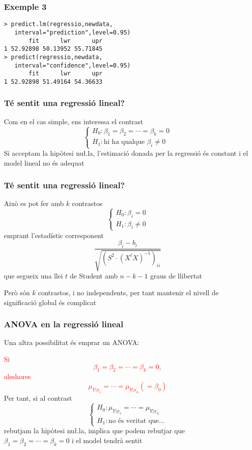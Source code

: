\documentclass[12pt,t]{beamer}
\newcommand{\red}[1]{\textcolor{red}{#1}}
\theoremstyle{plain}
\theoremstyle{definition}
\begin{document}
\begin{frame}[fragile]
\frametitle{Exemple 3}
\vspace*{-2ex}

\begin{verbatim}
> predict.lm(regressio,newdata,
   interval="prediction",level=0.95)
       fit      lwr      upr
1 52.92898 50.13952 55.71845
> predict(regressio,newdata,
   interval="confidence",level=0.95)
       fit      lwr      upr
1 52.92898 51.49164 54.36633
\end{verbatim}

\end{frame}

\begin{frame}
\frametitle{Té sentit una regressió lineal?}
Com en el cas simple, ens interessa el contrast
$$
\left\{\begin{array}{l} H_0: \beta_1=\beta_2=\cdots=\beta_k=0 \\
H_1: \mbox{hi ha qualque }\beta_i\not= 0 \end{array}
\right.
$$
Si acceptam la hipòtesi nu\l.la, l'estimació donada per la regressió és constant i el model lineal no és adequat

\end{frame}

\begin{frame}
\frametitle{Té sentit una regressió lineal?}

Això es pot fer amb $k$ contrastos
$$
\left\{\begin{array}{l} H_0: \beta_i=0 \\
H_1: \beta_i\neq 0 \end{array}
\right.
$$
emprant l'estadístic corresponent
$$
\frac{\beta_i-b_i}{\sqrt{(S^2\cdot (X^t X)^{-1})_{ii}}}
$$
que segueix una llei $t$ de Student amb $n-k-1$ graus de
llibertat\medskip

Però són $k$ contrastos, i no independents, per tant mantenir el nivell de significació global és complicat


\end{frame}




\begin{frame}
\frametitle{ANOVA en la  regressió lineal}

Una altra possibilitat és emprar un ANOVA:
\medskip

\red{Si $$\beta_1=\beta_2=\cdots=\beta_k=0,$$ aleshores $$\mu_{Y|\underline{x}_1}=\cdots=\mu_{Y|\underline{x}_n}(=\beta_0)$$}
Per tant, si al contrast
$$
\left\{\begin{array}{l}
H_0:\mu_{Y|\underline{x}_1}=\cdots=\mu_{Y|\underline{x}_n}\\
H_1:\mbox{no és veritat que\ldots}
\end{array}
\right.
$$
rebutjam la hipòtesi nu\l.la, implica que podem rebutjar que $\beta_1=\beta_2=\cdots=\beta_k=0$
i el model tendrà sentit
\end{frame}
\end{document}
